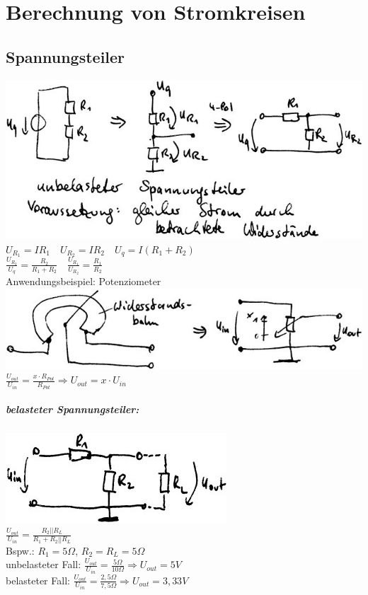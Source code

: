 \chapter{Berechnung von Stromkreisen}

\section{Spannungsteiler}

\includegraphics[scale=.75]{Abbildungen/ABB209}\\
$U_{R_1}=IR_1 \quad U_{R_2}=IR_2 \quad U_q= I(R_1+R_2)$\\
$\frac{U_{R_2}}{U_q}=\frac{R_2}{R_1+R_2} \quad \frac{U_{R_1}}{U_{R_2}}=\frac{R_1}{R_2}$\\
Anwendungsbeispiel: Potenziometer\\
\includegraphics[scale=.75]{Abbildungen/ABB210}\\
$\frac{U_{out}}{U_{in}}=\frac{x\cdot R_{Pot}}{R_{Pot}}\Rightarrow U_{out} = x \cdot U_{in}$
\paragraph{belasteter Spannungsteiler:}\parskp
\includegraphics[scale=.75]{Abbildungen/ABB211}\\
$\frac{U_{out}}{U_{in}}=\frac{R_2||R_L}{R_1+R_2||R_L}$\\
Bspw.: $R_1=5 \Omega$, $R_2=R_L=5 \Omega$\\
unbelasteter Fall: $\frac{U_{out}}{U_{in}}=\frac{5 \Omega}{10 \Omega} \Rightarrow U_{out}=5V$\\
belasteter Fall: $\frac{U_{out}}{U_{in}}=\frac{2,5 \Omega}{7,5 \Omega}\Rightarrow U_{out}=3,33V$

